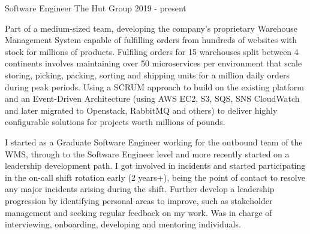 \cventry
    {Software Engineer} %
    {The Hut Group} %
    {} %
    {2019 - present} %
    {\begin{cvitems}
        \item{Part of a medium-sized team, developing the company's proprietary Warehouse Management System 
        capable of fulfilling orders from hundreds of websites with stock for millions of products. Fulfiling 
        orders for 15 warehouses split between 4 continents involves maintaining over 50 microservices per environment
        that scale storing, picking, packing, sorting and shipping units for a million daily orders during peak 
        periods. Using a SCRUM approach to build on the existing platform and an Event-Driven Architecture 
        (using AWS EC2, S3, SQS, SNS CloudWatch and later migrated to Openstack, RabbitMQ and others) 
        to deliver highly configurable solutions for projects worth millions of pounds.}
        \item{I started as a Graduate Software Engineer working for the outbound team of the WMS, through to the 
        Software Engineer level and more recently started on a leadership development path. I got involved in 
        incidents and started participating in the on-call shift rotation early (2 years+), being the point of 
        contact to resolve any major incidents arising during the shift. Further develop a leadership progression 
        by identifying personal areas to improve, such as stakeholder management and seeking regular feedback on 
        my work. Was in charge of interviewing, onboarding, developing and mentoring individuals.}
    \end{cvitems}}
